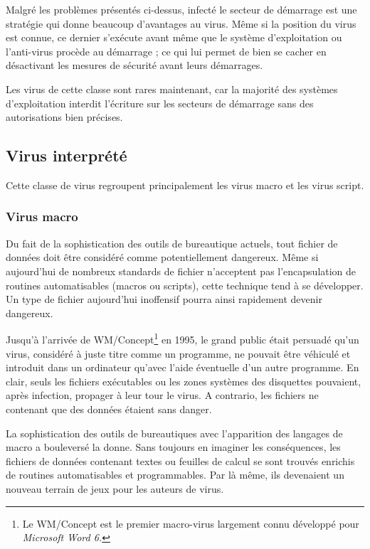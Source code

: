     Malgré les problèmes présentés ci-dessus, infecté le secteur de démarrage est une stratégie qui donne beaucoup
    d'avantages au virus. Même si la position du virus est connue, ce dernier s'exécute avant même que le système 
    d'exploitation ou l'anti-virus procède au démarrage ; ce qui lui permet de bien se cacher en désactivant les mesures 
    de sécurité avant leurs démarrages. %


    Les virus de cette classe sont rares maintenant, car la majorité des systèmes d'exploitation interdit l'écriture
    sur les secteurs de démarrage sans des autorisations bien précises.

    \subsection{Virus interprété}
    Cette classe de virus regroupent principalement les virus macro et les virus script. %
        \subsubsection{Virus macro}
        Du fait de la sophistication des outils de bureautique actuels, tout fichier de données doit être 
        considéré comme potentiellement dangereux. Même si aujourd’hui de nombreux standards de fichier 
        n’acceptent pas l’encapsulation de routines automatisables (macros ou scripts), 
        cette technique tend à se développer. Un type de fichier aujourd’hui inoffensif pourra ainsi 
        rapidement devenir dangereux. \cite{virus_informatique_article} %

        Jusqu’à l’arrivée de WM/Concept\footnote{Le WM/Concept est le premier macro-virus largement connu
        développé pour \emph{Microsoft Word 6.}} en 1995, le grand public était persuadé qu’un virus, 
        considéré à juste titre comme un programme, ne pouvait être véhiculé et introduit dans un ordinateur 
        qu’avec l'aide éventuelle d’un autre programme. En clair, seuls les fichiers exécutables ou les zones 
        systèmes des disquettes pouvaient, après infection, propager à leur tour le virus. 
        A contrario, les fichiers ne contenant que des données étaient sans danger. \cite{virus_informatique_article}

        La sophistication des outils de bureautiques avec l’apparition des langages de macro a bouleversé 
        la donne. Sans toujours en imaginer les conséquences, les fichiers de données contenant textes ou feuilles 
        de calcul se sont trouvés enrichis de routines automatisables et programmables. 
        Par là même, ils devenaient un nouveau terrain de jeux pour les auteurs de virus. 
        \cite{virus_informatique_article} %


